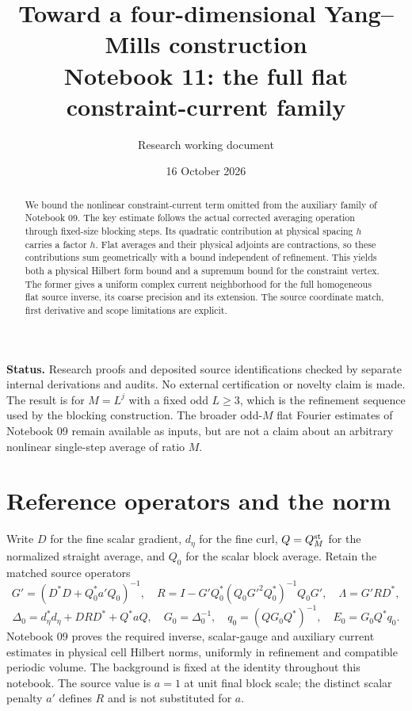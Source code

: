 \documentclass[11pt]{article}
\title{Toward a four-dimensional Yang--Mills construction\\
\large Notebook 11: the full flat constraint-current family}
\author{Research working document}
\date{16 October 2026}
\theoremstyle{remark}
\begin{document}
\maketitle
\begin{abstract}
We bound the nonlinear constraint-current term omitted from the
auxiliary family of Notebook 09. The key estimate follows the actual
corrected averaging operation through fixed-size blocking steps.
Its quadratic contribution at physical spacing $h$ carries a factor
$h$. Flat averages and their physical adjoints are contractions, so
these contributions sum geometrically with a bound independent of
refinement. This yields both a physical Hilbert form bound and a
supremum bound for the constraint vertex. The former gives a uniform
complex current neighborhood for the full homogeneous flat source
inverse, its coarse precision and its extension. The source coordinate
match, first derivative and scope limitations are explicit.
\end{abstract}

\noindent\textbf{Status.}
Research proofs and deposited source identifications checked by separate
internal derivations and audits. No external certification or novelty
claim is made. The result is for $M=L^j$ with a fixed odd $L\ge3$,
which is the refinement sequence used by the blocking construction.
The broader odd-$M$ flat Fourier estimates of Notebook 09 remain
available as inputs, but are not a claim about an arbitrary nonlinear
single-step average of ratio $M$.

\section{Reference operators and the norm}

Write $D$ for the fine scalar gradient, $d_\eta$ for the fine curl,
$Q=Q_M^{\rm st}$ for the normalized straight average, and $Q_0$ for
the scalar block average. Retain the matched source operators
\[
 G'=(D^*D+Q_0^*a'Q_0)^{-1},\quad
 R=I-G'Q_0^*(Q_0G'^2Q_0^*)^{-1}Q_0G',\quad
 \Lambda=G'RD^*,
\]
\[
 \Delta_0=d_\eta^*d_\eta+DRD^*+Q^*aQ,\quad
 G_0=\Delta_0^{-1},\quad q_0=(QG_0Q^*)^{-1},\quad
 E_0=G_0Q^*q_0.
\]
Notebook 09 proves the required inverse, scalar-gauge and auxiliary
current estimates in physical cell Hilbert norms, uniformly in
refinement and compatible periodic volume. The background is fixed
at the identity throughout this notebook. The source value is $a=1$
at unit final block scale; the distinct scalar penalty $a'$ defines
$R$ and is not substituted for $a$.
\end{document}
